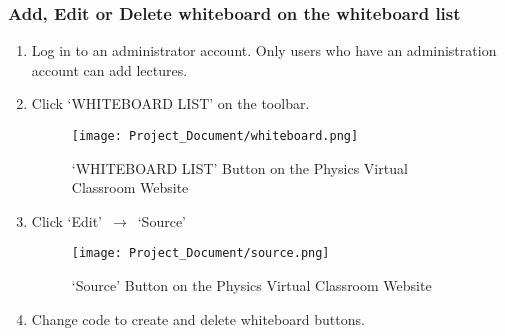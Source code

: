 \documentclass[10pt]{article}
\begin{document}
        \subsubsection{Add, Edit or Delete whiteboard on the whiteboard list}
            \begin{enumerate}
            	\item Log in to an administrator account. Only users who have an administration account can add lectures.
            	\item Click `WHITEBOARD LIST' on the toolbar.
            	    \begin{figure}[!ht]
            	        \centering
                        \texttt{[image: Project\_Document/whiteboard.png]}
                        \caption{`WHITEBOARD LIST' Button on the Physics Virtual Classroom Website}
                    \end{figure}
\newpage
            	\item Click `Edit' $\,\to\,$ `Source'
            	    \begin{figure}[!ht]
            	        \centering
                        \texttt{[image: Project\_Document/source.png]}
                        \caption{`Source' Button on the Physics Virtual Classroom Website}
                    \end{figure}
            	\item Change code to create and delete whiteboard buttons.
            \end{enumerate}
\end{document}
